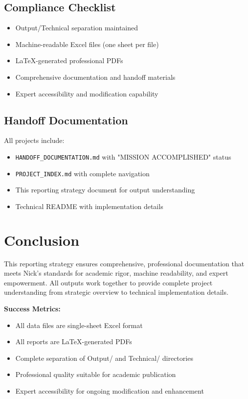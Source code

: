 \documentclass[11pt,letterpaper]{article}
\begin{document}
\subsection{Compliance Checklist}
\begin{itemize}
    \item[\checkmark] Output/Technical separation maintained
    \item[\checkmark] Machine-readable Excel files (one sheet per file)
    \item[\checkmark] LaTeX-generated professional PDFs
    \item[\checkmark] Comprehensive documentation and handoff materials
    \item[\checkmark] Expert accessibility and modification capability
\end{itemize}

\subsection{Handoff Documentation}
All projects include:
\begin{itemize}
    \item \texttt{HANDOFF\_DOCUMENTATION.md} with "MISSION ACCOMPLISHED" status
    \item \texttt{PROJECT\_INDEX.md} with complete navigation
    \item This reporting strategy document for output understanding
    \item Technical README with implementation details
\end{itemize}

\section{Conclusion}

This reporting strategy ensures comprehensive, professional documentation that meets Nick's standards for academic rigor, machine readability, and expert empowerment. All outputs work together to provide complete project understanding from strategic overview to technical implementation details.

\textbf{Success Metrics:}
\begin{itemize}
    \item All data files are single-sheet Excel format
    \item All reports are LaTeX-generated PDFs
    \item Complete separation of Output/ and Technical/ directories
    \item Professional quality suitable for academic publication
    \item Expert accessibility for ongoing modification and enhancement
\end{itemize}
\end{document}
